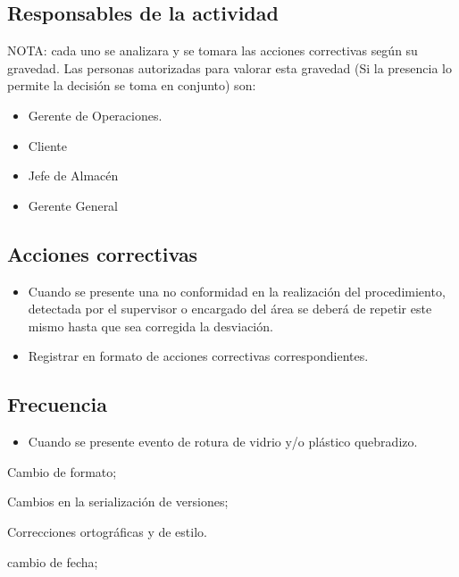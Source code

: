 \subsection{Responsables de la actividad}

NOTA: cada uno se analizara y se tomara las acciones correctivas según su gravedad. Las personas autorizadas para valorar esta gravedad (Si la presencia lo permite la decisión se toma en conjunto) son:

\begin{itemize}
	\item Gerente de Operaciones.
	\item Cliente
	\item Jefe de Almacén
	\item Gerente General
\end{itemize}

\subsection{Acciones correctivas}

\begin{itemize}
	\item Cuando se presente una no conformidad en la realización del procedimiento, detectada por el supervisor o encargado del área se deberá de repetir este mismo hasta que sea corregida la desviación.
	\item Registrar en formato de acciones correctivas correspondientes.
\end{itemize}

\subsection{Frecuencia}

\begin{itemize}
	\item Cuando se presente evento de rotura de vidrio y/o plástico quebradizo.
\end{itemize}

\begin{changelog}[title=Registro de cambios,simple, sectioncmd=\subsection*,label=changelog-\thesection-\MayorVer.\MenorVer]
	\begin{version}[v=\MayorVer.\MenorVer, date=2023--01, author=Pablo E. Alanis]
		\item Cambio de formato;
		\item Cambios en la serialización de versiones;
		\item Correcciones ortográficas y de estilo.
	\end{version}

	\begin{version}[v=1.7, date=2022--05, author=Alonso M.]
		\item cambio de fecha;
	\end{version}

\end{changelog}

